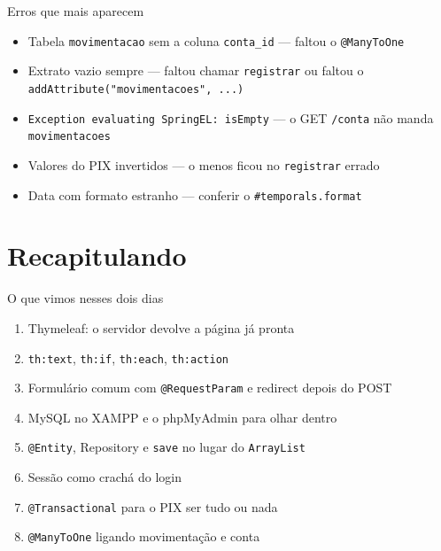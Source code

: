 \documentclass[aspectratio=169,11pt]{beamer}
\begin{document}
\begin{frame}{Erros que mais aparecem}
  \begin{itemize}
    \item Tabela \texttt{movimentacao} sem a coluna \texttt{conta\_id} ---
          faltou o \texttt{@ManyToOne}
    \item Extrato vazio sempre --- faltou chamar \texttt{registrar}
          ou faltou o \texttt{addAttribute("movimentacoes", ...)}
    \item \texttt{Exception evaluating SpringEL: isEmpty} --- o GET
          \texttt{/conta} não manda \texttt{movimentacoes}
    \item Valores do PIX invertidos --- o menos ficou no
          \texttt{registrar} errado
    \item Data com formato estranho --- conferir o
          \texttt{\#temporals.format}
  \end{itemize}
\end{frame}

\section{Recapitulando}

\begin{frame}{O que vimos nesses dois dias}
  \begin{enumerate}
    \item Thymeleaf: o servidor devolve a página já pronta
    \item \texttt{th:text}, \texttt{th:if}, \texttt{th:each}, \texttt{th:action}
    \item Formulário comum com \texttt{@RequestParam} e redirect depois do POST
    \item MySQL no XAMPP e o phpMyAdmin para olhar dentro
    \item \texttt{@Entity}, Repository e \texttt{save} no lugar do \texttt{ArrayList}
    \item Sessão como crachá do login
    \item \texttt{@Transactional} para o PIX ser tudo ou nada
    \item \texttt{@ManyToOne} ligando movimentação e conta
  \end{enumerate}
\end{frame}
\end{document}
